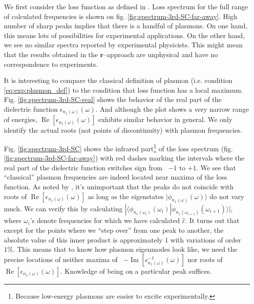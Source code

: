 \documentclass[a4paper,12pt]{article}
\begin{document}
    We first consider the loss function as defined in \cite{plasmonic2015}. Loss spectrum for the full range of calculated frequencies is shown on fig. \ref{fig:spectrum-3rd-SC-far-away}. High number of sharp peaks implies that there is a handful of plasmons. On one hand, this means lots of possibilities for experimental applications. On the other hand, we see no similar spectra reported by experimental physicists. This might mean that the results obtained in the $\mathbf{r}$--approach are unphysical and have no correspondence to experiments.
    
    It is interesting to compare the classical definition of plasmon (i.e. condition \eqref{eq:exp:plasmon_def}) to the condition that loss function has a local maximum. Fig. \ref{fig:spectrum-3rd-SC-real} shows the behavior of the real part of the dielectric function $\epsilon_{n_1(\omega)}(\omega)$. And although the plot shows a very narrow range of energies, $\operatorname{Re} [\epsilon_{n_1(\omega)}(\omega)]$ exhibits similar behavior in general. We only identify the actual roots (not points of discontinuity) with plasmon frequencies.
    
    Fig. \ref{fig:spectrum-3rd-SC} shows the infrared part\footnote{%
        Because low-energy plasmons are easier to excite experimentally. 
    } of the loss spectrum (fig. \ref{fig:spectrum-3rd-SC-far-away}) with red dashes marking the intervals where the real part of the dielectric function switches sign from \ $-1$ to $+1$. We see that ``classical'' plasmon frequencies are indeed located near maxima of the loss function. As noted by \cite{andersen2012spatially}, it's unimportant that the peaks do not coincide with roots of $\operatorname{Re} [\epsilon_{n_1(\omega)}(\omega)]$ as long as the eigenstates $|\phi_{n_1(\omega)}(\omega)\rangle$ do not vary much. We can verify this by calculating $|\langle \phi_{n_1(\omega_i)}(\omega_i) | \phi_{n_1(\omega_{i+1})}(\omega_{i+1}) \rangle|$, where $\omega_i$'s denote frequencies for which we have calculated $\hat\varepsilon$. It turns out that except for the points where we ``step over'' from one peak to another, the absolute value of this inner product is approximately $1$ with variations of order $1\%$. This means that to know how plasmon eigenmodes look like, we need the precise locations of neither  maxima of \ $-\operatorname{Im}[\epsilon_{n_1(\omega)}^{-1}(\omega)]$ nor roots of $\operatorname{Re} [\epsilon_{n_1(\omega)}(\omega)]$. Knowledge of being on a particular peak suffices. 
\end{document}
